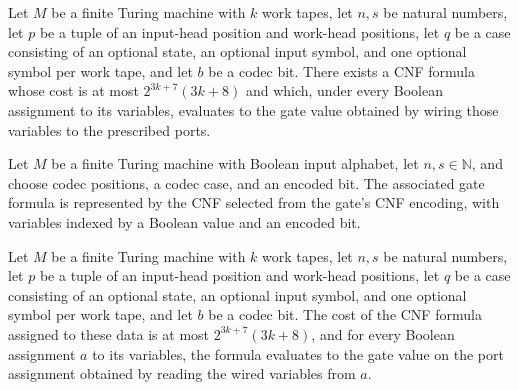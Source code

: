 \begin{theorem}
\label{Complexity.codecGate_cnf}
\leanok
{}
Let $M$ be a finite Turing machine with $k$ work tapes, let $n,s$ be natural numbers,
let $p$ be a tuple of an input-head position and work-head positions, let $q$ be a case
consisting of an optional state, an optional input symbol, and one optional symbol per
work tape, and let $b$ be a codec bit. There exists a CNF formula whose cost is at most
$2^{3k+7}(3k+8)$ and which, under every Boolean assignment to its variables, evaluates
to the gate value obtained by wiring those variables to the prescribed ports.
\end{theorem}

\begin{definition}
\label{Complexity.codecGateCNF}
\leanok
{}
Let $M$ be a finite Turing machine with Boolean input alphabet, let $n,s\in\mathbb{N}$,
and choose codec positions, a codec case, and an encoded bit. The associated gate
formula is represented by the CNF selected from the gate's CNF encoding, with variables
indexed by a Boolean value and an encoded bit.
\end{definition}

\begin{theorem}
\label{Complexity.codecGateCNF_spec}
\leanok
{}
Let $M$ be a finite Turing machine with $k$ work tapes, let $n,s$ be natural numbers,
let $p$ be a tuple of an input-head position and work-head positions, let $q$ be a case
consisting of an optional state, an optional input symbol, and one optional symbol per
work tape, and let $b$ be a codec bit. The cost of the CNF formula assigned to these
data is at most $2^{3k+7}(3k+8)$, and for every Boolean assignment $a$ to its variables,
the formula evaluates to the gate value on the port assignment obtained by reading the
wired variables from $a$.
\end{theorem}

